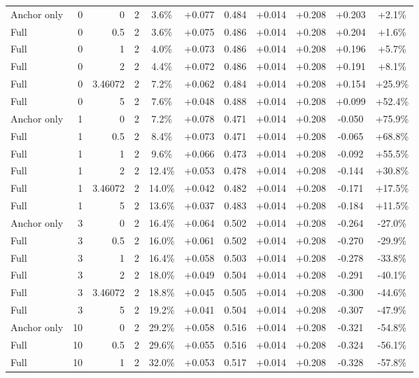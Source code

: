\begin{table}[htbp]
\begin{tabular}{lrrrccccccc}
Anchor only & 0 & 0 & 2 & 3.6\% & +0.077 & 0.484 & +0.014 & +0.208 & +0.203 & +2.1\% \\
Full & 0 & 0.5 & 2 & 3.6\% & +0.075 & 0.486 & +0.014 & +0.208 & +0.204 & +1.6\% \\
Full & 0 & 1 & 2 & 4.0\% & +0.073 & 0.486 & +0.014 & +0.208 & +0.196 & +5.7\% \\
Full & 0 & 2 & 2 & 4.4\% & +0.072 & 0.486 & +0.014 & +0.208 & +0.191 & +8.1\% \\
Full & 0 & 3.46072 & 2 & 7.2\% & +0.062 & 0.484 & +0.014 & +0.208 & +0.154 & +25.9\% \\
Full & 0 & 5 & 2 & 7.6\% & +0.048 & 0.488 & +0.014 & +0.208 & +0.099 & +52.4\% \\
Anchor only & 1 & 0 & 2 & 7.2\% & +0.078 & 0.471 & +0.014 & +0.208 & -0.050 & +75.9\% \\
Full & 1 & 0.5 & 2 & 8.4\% & +0.073 & 0.471 & +0.014 & +0.208 & -0.065 & +68.8\% \\
Full & 1 & 1 & 2 & 9.6\% & +0.066 & 0.473 & +0.014 & +0.208 & -0.092 & +55.5\% \\
Full & 1 & 2 & 2 & 12.4\% & +0.053 & 0.478 & +0.014 & +0.208 & -0.144 & +30.8\% \\
Full & 1 & 3.46072 & 2 & 14.0\% & +0.042 & 0.482 & +0.014 & +0.208 & -0.171 & +17.5\% \\
Full & 1 & 5 & 2 & 13.6\% & +0.037 & 0.483 & +0.014 & +0.208 & -0.184 & +11.5\% \\
Anchor only & 3 & 0 & 2 & 16.4\% & +0.064 & 0.502 & +0.014 & +0.208 & -0.264 & -27.0\% \\
Full & 3 & 0.5 & 2 & 16.0\% & +0.061 & 0.502 & +0.014 & +0.208 & -0.270 & -29.9\% \\
Full & 3 & 1 & 2 & 16.4\% & +0.058 & 0.503 & +0.014 & +0.208 & -0.278 & -33.8\% \\
Full & 3 & 2 & 2 & 18.0\% & +0.049 & 0.504 & +0.014 & +0.208 & -0.291 & -40.1\% \\
Full & 3 & 3.46072 & 2 & 18.8\% & +0.045 & 0.505 & +0.014 & +0.208 & -0.300 & -44.6\% \\
Full & 3 & 5 & 2 & 19.2\% & +0.041 & 0.504 & +0.014 & +0.208 & -0.307 & -47.9\% \\
Anchor only & 10 & 0 & 2 & 29.2\% & +0.058 & 0.516 & +0.014 & +0.208 & -0.321 & -54.8\% \\
Full & 10 & 0.5 & 2 & 29.6\% & +0.055 & 0.516 & +0.014 & +0.208 & -0.324 & -56.1\% \\
Full & 10 & 1 & 2 & 32.0\% & +0.053 & 0.517 & +0.014 & +0.208 & -0.328 & -57.8\% \\

\end{tabular}
\end{table}
